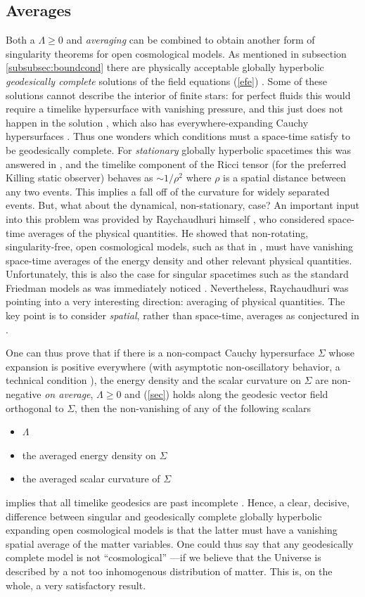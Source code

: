 \documentclass[12pt]{iopart}
\begin{document}
\subsection{Averages}
Both a $\Lambda\geq 0$ and {\em averaging} can be combined to obtain another form of singularity theorems for open cosmological models. As mentioned in subsection \ref{subsubsec:boundcond} there are physically acceptable globally hyperbolic {\em geodesically complete} solutions of the field equations (\ref{efe}) \cite{S,CFS,RS,S1}. Some of these solutions cannot describe the interior of finite stars: for perfect fluids this would require a timelike hypersurface with vanishing pressure, and this just does not happen in the solution \cite{S}, which also has everywhere-expanding Cauchy hypersurfaces \cite{CFS,SRay}. Thus one wonders which conditions must a space-time satisfy to be geodesically complete. For {\em stationary} globally hyperbolic spacetimes this was answered in \cite{GaH}, and the timelike component of the Ricci tensor (for the preferred Killing static observer) behaves as $\sim 1/\rho^2$ where $\rho$ is a spatial distance between any two events. This implies a fall off of the curvature for widely separated events. But, what about the dynamical, non-stationary, case? An important input into this problem was provided by Raychaudhuri himself \cite{Ray3}, who considered space-time averages of the physical quantities. He showed that non-rotating, singularity-free, open cosmological models, such as that in \cite{S}, must have vanishing space-time averages of the energy density and other relevant physical quantities. Unfortunately, this is also the case for singular spacetimes such as the standard Friedman models as was immediately noticed \cite{Saa,S3}. Nevertheless, Raychaudhuri was pointing into a very interesting direction: averaging of physical quantities. The key point is to consider {\em spatial}, rather than space-time, averages as conjectured in \cite{S3}. 

One can thus prove \cite{SRay} that if there is a non-compact Cauchy hypersurface $\Sigma$ whose expansion is positive everywhere (with asymptotic non-oscillatory behavior, a technical condition \cite{J}), the energy density and the scalar curvature on $\Sigma$ are non-negative {\em on average}, $\Lambda\geq 0$ and (\ref{sec}) holds along the geodesic vector field orthogonal to $\Sigma$, then the non-vanishing of any of the following scalars
\begin{itemize}
\item $\Lambda$
\item the averaged energy density on $\Sigma$
\item the averaged scalar curvature of $\Sigma$ 
\end{itemize}
implies that all timelike geodesics are past incomplete \cite{SRay,J}. Hence, a clear, decisive, difference between singular and
geodesically complete globally hyperbolic expanding
open cosmological models is that the latter must have a
vanishing spatial average of the matter variables.
One could thus say that any geodesically complete model is not
``cosmological'' ---if we believe that the Universe is described by
a not too inhomogenous distribution of matter.
This is, on the whole, a very satisfactory result.
\end{document}
